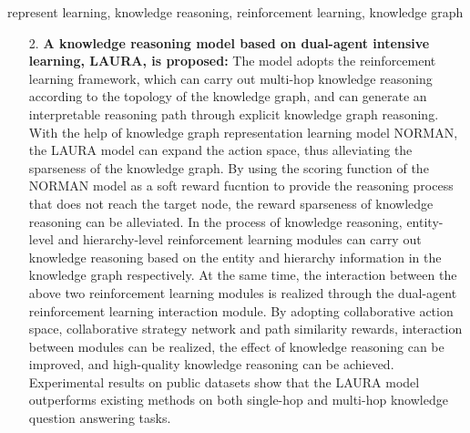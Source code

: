 \documentclass[algorithmlist, AutoFakeBold, AutoFakeSlant, figurelist, tablelist, nomlist, engineering]{seuthesix}
\begin{document}
\begin{englishabstract}{represent learning, knowledge reasoning, reinforcement learning, knowledge graph}
\begin{itemize}
    Then, the causal inference module is used to construct a causal graph of the graph neural network module, and the method of causal intervention of neighborhood information is adopted to comprehensively consider a variety of factors such as hierarchical difference score, decision difference score, predictive confidence score and inference distance score to evaluate whether the current node receives information from the neighborhood nodes and improve stability of the model.
    At the same time, through the graph neural network module, the results of the hierarchical information extraction module is used as the auxiliary, and the causal inference module is used to evaluate whether to receive neighborhood information. 
    The completed training model can convert the input knowledge triples into the knowledge graph representation vectors and can be used for the tasks of knowledge reasoning.
    Experimental results on public datasets show that the NORMAN model outperforms existing methods on knowledge graph completion tasks.
    \item [2.]\textbf{A knowledge reasoning model based on dual-agent intensive learning, LAURA, is proposed:}
    The model adopts the reinforcement learning framework, which can carry out multi-hop knowledge reasoning according to the topology of the knowledge graph, and can generate an interpretable reasoning path through explicit knowledge graph reasoning.
    With the help of knowledge graph representation learning model NORMAN, the LAURA model can expand the action space, thus alleviating the sparseness of the knowledge graph. 
    By using the scoring function of the NORMAN model as a soft reward fucntion to provide the reasoning process that does not reach the target node, the reward sparseness of knowledge reasoning can be alleviated.
    In the process of knowledge reasoning, entity-level and hierarchy-level reinforcement learning modules can carry out knowledge reasoning based on the entity and hierarchy information in the knowledge graph respectively.
    At the same time, the interaction between the above two reinforcement learning modules is realized through the dual-agent reinforcement learning interaction module. By adopting collaborative action space, collaborative strategy network and path similarity rewards, interaction between modules can be realized, the effect of knowledge reasoning can be improved, and high-quality knowledge reasoning can be achieved.
    Experimental results on public datasets show that the LAURA model outperforms existing methods on both single-hop and multi-hop knowledge question answering tasks.
  \end{itemize}
\end{englishabstract} 
\end{document}
